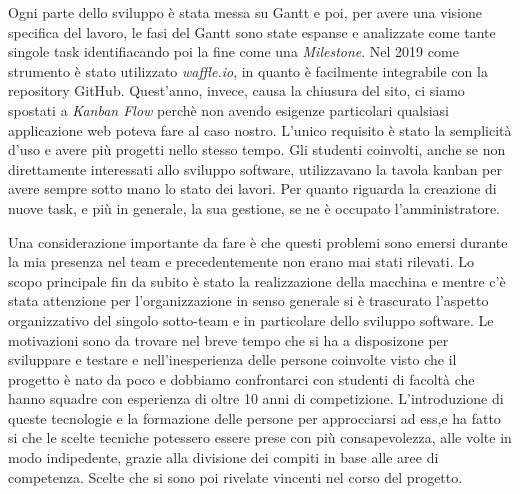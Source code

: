Ogni parte dello sviluppo è stata messa su Gantt e poi, per avere una visione specifica del lavoro, 
le fasi del Gantt sono state espanse e analizzate come tante singole task identifiacando poi la fine come una \emph{Milestone}.
Nel 2019 come strumento è stato utilizzato \emph{waffle.io}, in quanto è facilmente integrabile con la repository GitHub.
Quest'anno, invece, causa la chiusura del sito, ci siamo spostati a \emph{Kanban Flow} perchè non avendo esigenze particolari qualsiasi applicazione web
poteva fare al caso nostro. L'unico requisito è stato la semplicità d'uso e avere più progetti nello stesso tempo.
Gli studenti coinvolti, anche se non direttamente interessati allo sviluppo software, utilizzavano la tavola kanban per avere sempre sotto 
mano lo stato dei lavori. Per quanto riguarda la creazione di nuove task, e più in generale, la sua gestione, se ne è occupato l'amministratore. 


Una considerazione importante da fare è che questi problemi sono emersi durante la mia presenza nel team e precedentemente non erano mai stati rilevati.
Lo scopo principale fin da subito è stato la realizzazione della macchina e mentre c'è stata attenzione per l'organizzazione in senso 
generale si è trascurato l'aspetto organizzativo del singolo sotto-team e in particolare dello sviluppo software. 
Le motivazioni sono da trovare nel breve tempo che si ha a disposizone per sviluppare e testare e nell'inesperienza delle persone coinvolte
visto che il progetto è nato da poco e dobbiamo confrontarci con studenti di facoltà 
che hanno squadre con esperienza di oltre 10 anni di competizione.  
L'introduzione di queste tecnologie e la formazione delle persone per approcciarsi ad ess,e ha fatto si che le scelte tecniche potessero essere
prese con più consapevolezza, alle volte in modo indipedente, grazie alla divisione dei compiti in base alle aree di competenza. 
Scelte che si sono poi rivelate vincenti nel corso del progetto.

\newpage


